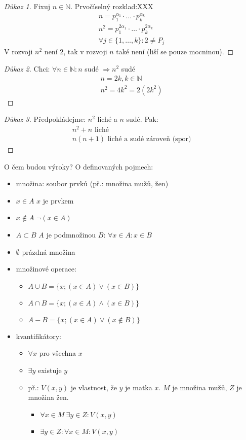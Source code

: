 \begin{proof}[Důkaz 1]
	Fixuj $n\in \mathbb{N}$. Prvočíselný rozklad:XXX
	\begin{gather}
		n = p_1^{\alpha_1} \cdot \ldots \cdot p_k^{\alpha_k} \\
		n^2 = p_1^{2\alpha_1} \cdot \ldots \cdot p_k^{2\alpha_k} \\
		\forall j \in \{1,\ldots,k\}: 2 \neq P_j
	\end{gather}
	V rozvoji $n^2$ není $2$, tak v rozvoji $n$ také není (liší se pouze mocninou).
\end{proof}
\begin{proof}[Důkaz 2]
	Chci: $\forall n \in \mathbb{N}: n$ sudé $\Rightarrow n^2$ sudé
	\begin{gather}
		n = 2k, k\in\mathbb{N} \\
		n^2 = 4k^2 = 2(2k^2)
	\end{gather}
\end{proof}
\begin{proof}[Důkaz 3]
	Předpokládejme: $n^2$ liché a $n$ sudé. Pak:
	\begin{gather}
		n^2 + n \text{ liché}  \\
		n(n + 1) \text{ liché a sudé zároveň (spor)}
	\end{gather}  
\end{proof}
O čem budou výroky? O definovaných pojmech:
\begin{itemize}
	\item množina: soubor prvků (př.: množina mužů, žen)
	\item $x\in A$ \quad $x$ je prvkem
	\item $x\notin A$ \quad $\lnot (x\in A)$
	\item $A\subset B$ \quad $A$ je podmnožinou $B$: $\forall x \in A: x \in B$
	\item $\emptyset$ \quad prázdná množina
	\item množinové operace:
	\begin{itemize}
		\item $A\cup B = \{x; (x\in A)\lor(x\in B)\}$
		\item $A\cap B = \{x; (x\in A)\land(x\in B)\}$
		\item $A - B = \{x; (x\in A)\lor(x\notin B)\}$
	\end{itemize}
	\item kvantifikátory:
	\begin{itemize}
		\item $\forall x$ \quad pro všechna $x$
		\item $\exists y$ \quad existuje $y$
		\item př.: $V(x,y)$ je vlastnost, že $y$ je matka $x$. $M$ je množina
			mužů, $Z$ je množina žen.
		\begin{itemize}
			\item $\forall x \in M~\exists y \in Z: V(x,y)$
			\item $\exists y \in Z: \forall x \in M: V(x,y)$
		\end{itemize}
	\end{itemize}
\end{itemize}

